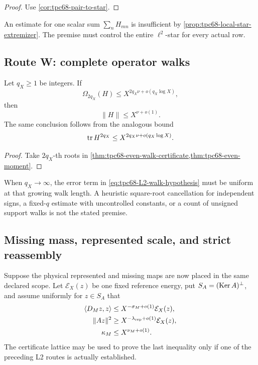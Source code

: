 \begin{proof}
Use \cref{cor:tpc68-pair-to-star}.
\end{proof}

An estimate for one scalar sum \(\sum_nH_{mn}\) is insufficient by
\cref{prop:tpc68-local-star-extremizer}.  The premise must control the
entire \(\ell^2\)-star for every actual row.

\subsection{Route W: complete operator walks}

\begin{proposition}
\label{prop:tpc68-conditional-walk}
Let \(q_X\ge1\) be integers.  If
\begin{equation}
 \Omega_{2q_X}(H)
 \le
 X^{2q_X\nu+o(q_X\log X)},
 \label{eq:tpc68-L2-walk-hypothesis}
\end{equation}
then
\begin{equation}
 \|H\|\le X^{\nu+o(1)}.
 \label{eq:tpc68-walk-exponent-output}
\end{equation}
The same conclusion follows from the analogous bound
\[
 \operatorname{tr} H^{2q_X}
 \le X^{2q_X\nu+o(q_X\log X)}.
\]
\end{proposition}

\begin{proof}
Take \(2q_X\)-th roots in
\cref{thm:tpc68-even-walk-certificate,thm:tpc68-even-moment}.
\end{proof}

When \(q_X\to\infty\), the error term in
\eqref{eq:tpc68-L2-walk-hypothesis} must be uniform at that growing walk
length.  A heuristic square-root cancellation for independent signs, a
fixed-\(q\) estimate with uncontrolled constants, or a count of unsigned
support walks is not the stated premise.

\subsection{Missing mass, represented scale, and strict reassembly}

Suppose the physical represented and missing maps are now placed in the
same declared scope.  Let \(\mathcal E_X(z)\) be one fixed reference
energy, put \(S_A=(\operatorname{Ker} A)^\perp\), and assume uniformly for
\(z\in S_A\) that
\begin{align}
 \langle D_Mz,z\rangle
 &\le X^{-\sigma_M+o(1)}\mathcal E_X(z),
 \label{eq:tpc68-L2-missing-mass}\\
 \|Az\|^2
 &\ge X^{-\lambda_{\rm rep}+o(1)}\mathcal E_X(z),
 \label{eq:tpc68-L2-represented-lower}\\
 \kappa_M
 &\le X^{\nu_M+o(1)}.
 \label{eq:tpc68-L2-kappa-exponent}
\end{align}
The certificate lattice may be used to prove the last inequality only if
one of the preceding L2 routes is actually established.

